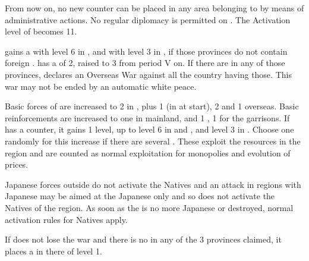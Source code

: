 \effetlong
\aparag From now on, no new \TP counter can be placed in any area belonging to
\paysJapon by means of administrative actions.
\aparag No regular diplomacy is permitted on \paysJapon.  The Activation level
of \paysJapon becomes 11.



\phevnt
\aparag \paysJapon gains a \TP with level 6 in \provinceSeoul,
\provincePyongyang and with level 3 in \granderegionFormose, if those
provinces do not contain foreign \TP. \paysJapon has a \FTI of 2, raised to 3
from period V on.
\aparag If there are \TP in any of those provinces, \paysJapon declares an
Overseas War against all the country having those. This war may not be ended
by an automatic white peace.

\phadm
\aparag Basic forces of \paysJapon are increased to 2 \ARMY\faceplus in
\paysJapon, plus 1 \ARMY\faceplus (in \granderegionCorea at start), 2 \LD and
1 \FLEET\facemoins overseas.
\aparag Basic reinforcements are increased to one \ARMY\faceplus in mainland,
and 1 \ARMY\facemoins, 1 \ND for the garrisons.
\aparag If \paysJapon has a \TP counter, it gains 1 level, up to level 6 in
\provinceSeoul and \provincePyongyang, and level 3 in
\granderegionFormose. Choose one randomly for this increase if there are
several \TP.  These \TP exploit the resources in the region and are counted as
normal exploitation for monopolies and evolution of prices.

\phmil
\aparag Japanese forces outside \granderegionJapan do not activate the Natives
and an attack in regions with Japanese \TP may be aimed at the Japanese only
and so does not activate the Natives of the region. As soon as the \TP is no
more Japanese or destroyed, normal activation rules for Natives apply.

\phpaix
\aparag If \paysJapon does not lose the war and there is no \TP in any of the
3 provinces claimed, it places a \TP in there of level 1.

\vfill \pagebreak



\vfill \pagebreak





